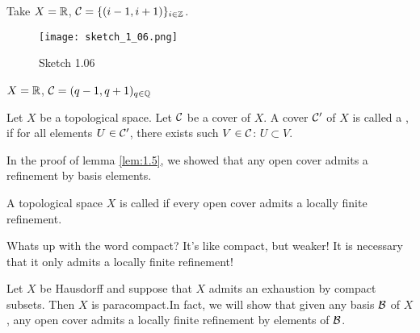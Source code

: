 \begin{example}
    Take \(X=\mathbb{R}\), \(\mathcal{C}=\{(i-1,i+1)\}_{i\in\mathbb{Z}}\).
    \begin{figure}[H]
        \centering
        \texttt{[image: sketch\_1\_06.png]}
        \caption{Sketch 1.06}
    \end{figure}
\end{example}

\begin{example}
    \(X=\mathbb{R}\), \(\mathcal{C}=(q-1,q+1)_{q\in\mathbb{Q}}\)
\end{example}

\begin{definition*}\label{def:refinement}
    Let \(X\) be a topological space. Let \(\mathcal{C}\) be a cover of \(X\). A cover \(\mathcal{C}'\) of \(X\) is called a 
    , if for all elements \(U\in\mathcal{C}'\), there exists such \(V\in\mathcal{C}\): \(U\subset V\).
\end{definition*}

\begin{example}
   In the proof of lemma \ref{lem:1.5}, we showed that any open cover admits a refinement by basis elements. 
\end{example}

\begin{definition*}
    A topological space \(X\) is called  if every open cover admits a locally finite refinement.
\end{definition*}

Whats up with the word compact? It's like compact, but weaker! It is necessary that it only admits a locally finite refinement!

\begin{lemma}\label{lem:1.7}
    Let \(X\) be Hausdorff and suppose that \(X\) admits an exhaustion by compact subsets. Then 
    \(X\) is paracompact.In fact, we will show that given any basis \(\mathcal{B}\) of \(X\), any open cover 
    admits a locally finite refinement by elements of \(\mathcal{B}\).
\end{lemma}

